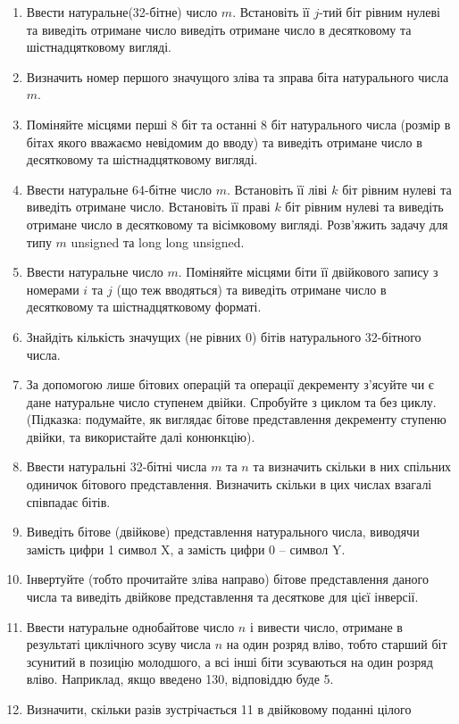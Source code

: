 \documentclass[]{article}
\begin{document}
\begin{enumerate}
\item
  Ввести натуральне(32-бітне) число $m$. Встановіть її $j$-тий біт рівним нулеві
  та виведіть отримане число виведіть отримане число в десятковому та
  шістнадцятковому вигляді.
\item
  Визначить номер першого значущого зліва та зправа біта натурального
  числа $m$.
\item
  Поміняйте місцями перші 8 біт та останні 8 біт натурального числа
  (розмір в бітах якого вважаємо невідомим до вводу) та виведіть
  отримане число в десятковому та шістнадцятковому вигляді.
\item
  Ввести натуральне 64-бітне число $m$. Встановіть її ліві $k$ біт рівним
  нулеві та виведіть отримане число. Встановіть її праві $k$ біт рівним
  нулеві та виведіть отримане число в десятковому та вісімковому
  вигляді. Розв'яжить задачу для типу $m$ unsigned та long long unsigned.
\item
  Ввести натуральне число $m$. Поміняйте місцями біти її двійкового запису
  з номерами $i$ та $j$ (що теж вводяться) та виведіть отримане число в
  десятковому та шістнадцятковому форматі.
\item
  Знайдіть кількість значущих (не рівних 0) бітів натурального
  32-бітного числа.
\item
  За допомогою лише бітових операцій та операції декременту з'ясуйте чи є
  дане натуральне число ступенем двійки. Спробуйте з циклом та без
  циклу. (Підказка: подумайте, як виглядає бітове представлення
  декременту ступеню двійки, та використайте далі конюнкцію).
\item
  Ввести натуральні 32-бітні числа $m$ та $n$ та визначить скільки в них
  спільних одиничок бітового представлення. Визначить скільки в цих
  числах взагалі співпадає бітів.
\item
  Виведіть бітове (двійкове) представлення натурального числа, 
виводячи замість цифри 1 символ X, а замість цифри 0 -- символ Y.
\item
  Інвертуйте (тобто прочитайте зліва направо) бітове представлення
  даного числа та виведіть двійкове представлення та десяткове для цієї
  інверсії.
\item
  Ввести натуральне однобайтове число $n$ і вивести число, отримане в
  результаті циклічного зсуву числа $n$ на один розряд вліво, тобто
  старший біт зсунитий в позицію молодшого, а всі інші біти зсуваються
  на один розряд вліво. Наприклад, якщо введено 130, відповіддю буде 5.
\item
  Визначити, скільки разів зустрічається 11 в двійковому поданні цілого

\end{enumerate}
\end{document}
